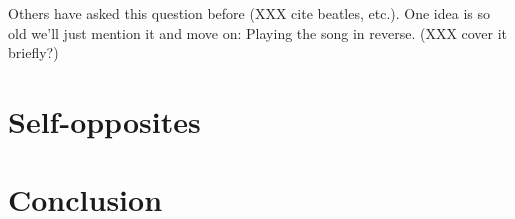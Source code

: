 \documentclass[twocolumn]{article}
\begin{document}
Others have asked this question before (XXX cite beatles, etc.). One
idea is so old we'll just mention it and move on: Playing the song
in reverse. (XXX cover it briefly?)


\section{Self-opposites} \label{sec:selfopposites}

\section{Conclusion}


{}

\end{document}
